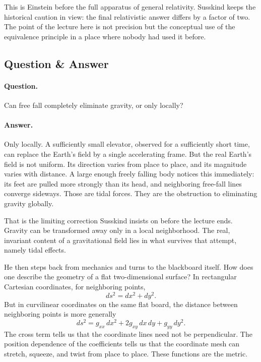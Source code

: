 This is Einstein before the full apparatus of general relativity. Susskind keeps the historical caution in view: the final relativistic answer differs by a factor of two. The point of the lecture here is not precision but the conceptual use of the equivalence principle in a place where nobody had used it before.

\subsection{Question \& Answer}

\paragraph{Question.} Can free fall completely eliminate gravity, or only locally?

\paragraph{Answer.} Only locally. A sufficiently small elevator, observed for a sufficiently short time, can replace the Earth's field by a single accelerating frame. But the real Earth's field is not uniform. Its direction varies from place to place, and its magnitude varies with distance. A large enough freely falling body notices this immediately: its feet are pulled more strongly than its head, and neighboring free-fall lines converge sideways. Those are tidal forces. They are the obstruction to eliminating gravity globally.

That is the limiting correction Susskind insists on before the lecture ends. Gravity can be transformed away only in a local neighborhood. The real, invariant content of a gravitational field lies in what survives that attempt, namely tidal effects.

He then steps back from mechanics and turns to the blackboard itself. How does one describe the geometry of a flat two-dimensional surface? In rectangular Cartesian coordinates, for neighboring points,
\begin{equation}
ds^2 = dx^2 + dy^2.
\end{equation}
But in curvilinear coordinates on the same flat board, the distance between neighboring points is more generally
\begin{equation}
ds^2 = g_{xx}\,dx^2 + 2g_{xy}\,dx\,dy + g_{yy}\,dy^2.
\end{equation}
The cross term tells us that the coordinate lines need not be perpendicular. The position dependence of the coefficients tells us that the coordinate mesh can stretch, squeeze, and twist from place to place. These functions are the metric.

